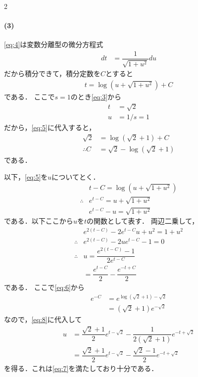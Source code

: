 \documentclass[../../main.tex]{subfiles}
\begin{document}
\begin{multicols}{2}
  \paragraph{(3)}
  \cref{eq:4}は変数分離型の微分方程式
  \begin{align}
    dt & = \dfrac{1}{\sqrt{1+u^2}} du
  \end{align}
  だから積分できて，積分定数を$C$とすると
  \begin{align}
    t = \log(u+\sqrt{1+u^2}) + C \label{eq:5}
  \end{align}
  である．
  ここで$s=1$のとき\cref{eq:3}から
  \begin{align}
    t & = \sqrt{2} \\
    u & = 1/s = 1
  \end{align}
  だから，\cref{eq:5}に代入すると，
  \begin{align}
    \sqrt{2}
    & = \log(\sqrt{2}+1)+C                            \\
    \therefore
    C
    & = \sqrt{2}-\log(\sqrt{2}+1) \label{eq:6}
  \end{align}
  である．

  以下，\cref{eq:5}を$u$についてとく．
  \begin{align}
    & t - C =  \log(u+\sqrt{1+u^2})                \\
    \therefore
    & e^{t-C} = u+\sqrt{1+u^2}                     \\
    & e^{t-C}-u = \sqrt{1+u^2} \label{eq:7}
  \end{align}
  である．以下ここから$u$を$t$の関数として表す．
  両辺二乗して，
  \begin{align}
    & e^{2(t-C)} -2e^{t-C}u + u^2 = 1 + u^2                        \\
    \therefore
    & e^{2(t-C)}-2ue^{t-C}-1    = 0                                \\
    \therefore
    & u
    = \dfrac{e^{2(t-C)}-1}{2e^{t-C}}                                 \\
    & = \dfrac{e^{t-C}}{2} - \dfrac{e^{-t+C}}{2} \label{eq:8}
  \end{align}
  である．
  ここで\cref{eq:6}から
  \begin{align}
    e^{-C}
    & = e^{\log(\sqrt{2}+1)-\sqrt{2}} \\
    & = (\sqrt{2}+1)e^{-\sqrt{2}}
  \end{align}
  なので，\cref{eq:8}に代入して
  \begin{align}
    u & = \dfrac{\sqrt{2}+1}{2}e^{t-\sqrt{2}} - \dfrac{1}{2(\sqrt{2}+1)}e^{-t+\sqrt{2}} \\
    & = \dfrac{\sqrt{2}+1}{2}e^{t-\sqrt{2}} - \dfrac{\sqrt{2}-1}{2}e^{-t+\sqrt{2}}
  \end{align}
  を得る．これは\cref{eq:7}を満たしており十分である．


\end{multicols}
\end{document}
